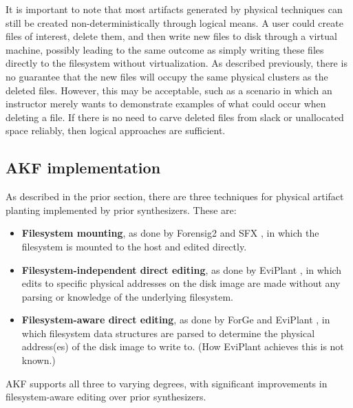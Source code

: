 It is important to note that most artifacts generated by physical
techniques can still be created non-deterministically through logical
means. A user could create files of interest, delete them, and then
write new files to disk through a virtual machine, possibly leading to
the same outcome as simply writing these files directly to the
filesystem without virtualization. As described previously, there is no
guarantee that the new files will occupy the same physical clusters as
the deleted files. However, this may be acceptable, such as a scenario
in which an instructor merely wants to demonstrate examples of what
could occur when deleting a file. If there is no need to carve deleted
files from slack or unallocated space reliably, then logical approaches
are sufficient.

\subsection{AKF implementation}\label{akf-implementation}

As described in the prior section, there are three techniques for
physical artifact planting implemented by prior synthesizers. These are:

\begin{itemize}
\tightlist
\item
  \textbf{Filesystem mounting}, as done by Forensig2
  \cite{mochForensicImageGenerator2009} and SFX
  \cite{russellForensicImageDescription2012}, in which the
  filesystem is mounted to the host and edited directly.
\item
  \textbf{Filesystem-independent direct editing}, as done by EviPlant
  \cite{scanlonEviPlantEfficientDigital2017}, in which edits to
  specific physical addresses on the disk image are made without any
  parsing or knowledge of the underlying filesystem.
\item
  \textbf{Filesystem-aware direct editing}, as done by ForGe
  \cite{vistiAutomaticCreationComputer2015} and EviPlant
  \cite{scanlonEviPlantEfficientDigital2017}, in which filesystem
  data structures are parsed to determine the physical address(es) of
  the disk image to write to. (How EviPlant achieves this is not known.)
\end{itemize}

AKF supports all three to varying degrees, with significant improvements
in filesystem-aware editing over prior synthesizers. ~

